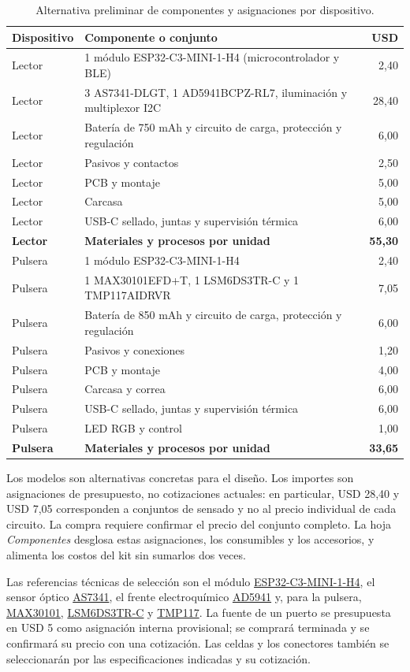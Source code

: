 \begin{table}[H]\centering\small
\caption{Alternativa preliminar de componentes y asignaciones por dispositivo.}
\begin{tabularx}{\linewidth}{l X r}\toprule
Dispositivo & Componente o conjunto & USD\\\midrule
Lector & 1 módulo ESP32-C3-MINI-1-H4 (microcontrolador y BLE) & 2,40\\
Lector & 3 AS7341-DLGT, 1 AD5941BCPZ-RL7, iluminación y multiplexor I2C & 28,40\\
Lector & Batería de 750 mAh y circuito de carga, protección y regulación & 6,00\\
Lector & Pasivos y contactos & 2,50\\
Lector & PCB y montaje & 5,00\\
Lector & Carcasa & 5,00\\
Lector & USB-C sellado, juntas y supervisión térmica & 6,00\\
\textbf{Lector} & \textbf{Materiales y procesos por unidad} & \textbf{55,30}\\\midrule
Pulsera & 1 módulo ESP32-C3-MINI-1-H4 & 2,40\\
Pulsera & 1 MAX30101EFD+T, 1 LSM6DS3TR-C y 1 TMP117AIDRVR & 7,05\\
Pulsera & Batería de 850 mAh y circuito de carga, protección y regulación & 6,00\\
Pulsera & Pasivos y conexiones & 1,20\\
Pulsera & PCB y montaje & 4,00\\
Pulsera & Carcasa y correa & 6,00\\
Pulsera & USB-C sellado, juntas y supervisión térmica & 6,00\\
Pulsera & LED RGB y control & 1,00\\
\textbf{Pulsera} & \textbf{Materiales y procesos por unidad} & \textbf{33,65}\\\bottomrule
\end{tabularx}\end{table}
Los modelos son alternativas concretas para el diseño. Los importes son asignaciones de presupuesto, no cotizaciones actuales: en particular, USD 28,40 y USD 7,05 corresponden a conjuntos de sensado y no al precio individual de cada circuito. La compra requiere confirmar el precio del conjunto completo. La hoja \textit{Componentes} desglosa estas asignaciones, los consumibles y los accesorios, y alimenta los costos del kit sin sumarlos dos veces.

Las referencias técnicas de selección son el módulo \href{https://www.lcsc.com/product-detail/C2934569.html}{ESP32-C3-MINI-1-H4}, el sensor óptico \href{https://www.lcsc.com/product-detail/C2655145.html}{AS7341}, el frente electroquímico \href{https://www.analog.com/en/products/ad5941.html}{AD5941} y, para la pulsera, \href{https://www.lcsc.com/product-detail/C2859066.html}{MAX30101}, \href{https://www.lcsc.com/product-detail/C967633.html}{LSM6DS3TR-C} y \href{https://www.ti.com/product/TMP117}{TMP117}. La fuente de un puerto se presupuesta en USD 5 como asignación interna provisional; se comprará terminada y se confirmará su precio con una cotización. Las celdas y los conectores también se seleccionarán por las especificaciones indicadas y su cotización.

